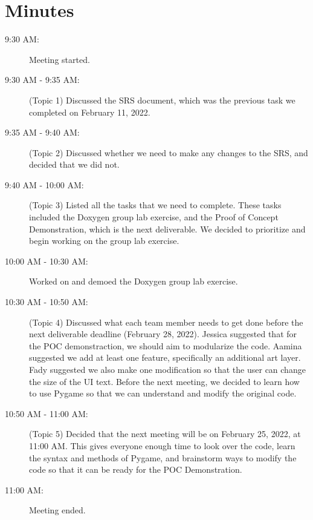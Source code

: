 \documentclass{article}
\begin{document}
\section{Minutes}

\begin{description}
    \item[9:30 AM:] Meeting started.
    \item[9:30 AM - 9:35 AM:] (Topic 1) Discussed the SRS document, which was the previous task we completed on February 11, 2022.
    \item[9:35 AM - 9:40 AM:] (Topic 2) Discussed whether we need to make any changes to the SRS, and decided that we did not.
    \item[9:40 AM - 10:00 AM:] (Topic 3) Listed all the tasks that we need to complete. These tasks included the Doxygen group lab exercise, and the Proof of Concept Demonstration, which is the next deliverable. We decided to prioritize and begin working on the group lab exercise.
    \item[10:00 AM - 10:30 AM:] Worked on and demoed the Doxygen group lab exercise.
    \item[10:30 AM - 10:50 AM:] (Topic 4) Discussed what each team member needs to get done before the next deliverable deadline (February 28, 2022). Jessica suggested that for the POC demonstraction, we should aim to modularize the code. Aamina suggested we add at least one feature, specifically an additional art layer. Fady suggested we also make one modification so that the user can change the size of the UI text. Before the next meeting, we decided to learn how to use Pygame so that we can understand and modify the original code.
    \item[10:50 AM - 11:00 AM:] (Topic 5) Decided that the next meeting will be on February 25, 2022, at 11:00 AM. This gives everyone enough time to look over the code, learn the syntax and methods of Pygame, and brainstorm ways to modify the code so that it can be ready for the POC Demonstration.
    \item[11:00 AM:] Meeting ended.
\end{description}
\end{document}

